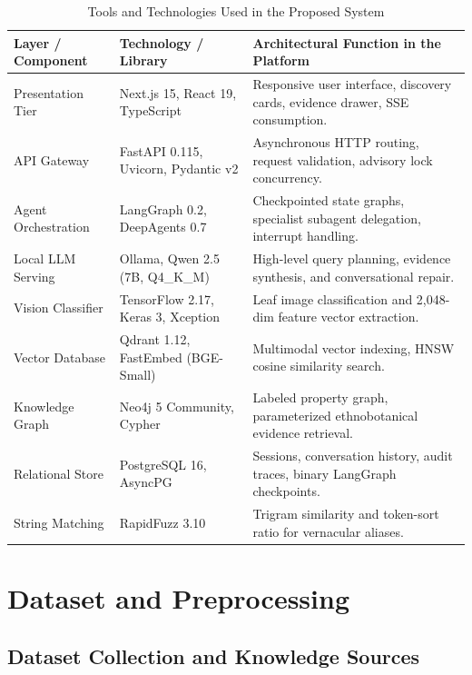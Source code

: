 \begin{table}[htbp]
\centering
\small
\setlength{\tabcolsep}{4pt}
\caption{Tools and Technologies Used in the Proposed System}
\label{tab:tools_summary}
\begin{tabular}{@{}p{3.2cm} p{3.8cm} p{8.2cm}@{}}
\hline
\textbf{Layer / Component} & \textbf{Technology / Library} & \textbf{Architectural Function in the Platform} \\
\hline
Presentation Tier & Next.js 15, React 19, TypeScript & Responsive user interface, discovery cards, evidence drawer, SSE consumption. \\
API Gateway & FastAPI 0.115, Uvicorn, Pydantic v2 & Asynchronous HTTP routing, request validation, advisory lock concurrency. \\
Agent Orchestration & LangGraph 0.2, DeepAgents 0.7 & Checkpointed state graphs, specialist subagent delegation, interrupt handling. \\
Local LLM Serving & Ollama, Qwen 2.5 (7B, Q4\_K\_M) & High-level query planning, evidence synthesis, and conversational repair. \\
Vision Classifier & TensorFlow 2.17, Keras 3, Xception & Leaf image classification and 2,048-dim feature vector extraction. \\
Vector Database & Qdrant 1.12, FastEmbed (BGE-Small) & Multimodal vector indexing, HNSW cosine similarity search. \\
Knowledge Graph & Neo4j 5 Community, Cypher & Labeled property graph, parameterized ethnobotanical evidence retrieval. \\
Relational Store & PostgreSQL 16, AsyncPG & Sessions, conversation history, audit traces, binary LangGraph checkpoints. \\
String Matching & RapidFuzz 3.10 & Trigram similarity and token-sort ratio for vernacular aliases. \\
\hline
\end{tabular}
\end{table}

\section{Dataset and Preprocessing}

\subsection{Dataset Collection and Knowledge Sources}

